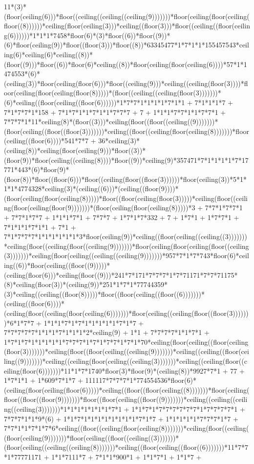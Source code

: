 11*(3)*(floor(ceiling(6)))*floor((ceiling((ceiling((ceiling(9)))))))*floor(ceiling(floor(ceiling(floor((8))))))*ceiling(floor(ceiling(3)))*ceiling((floor(3)))*floor((ceiling((floor(ceiling(6))))))*1*1*1*7458*floor(6)*(3)*floor((6))*floor((9))*(6)*floor(ceiling(9))*floor((floor(3)))*floor((8))*63345477*1*7*1*1*155457543*ceiling(6)*ceiling(6)*ceiling((8))*(floor((9)))*floor((6))*floor(6)*ceiling((8))*floor(ceiling(floor(ceiling(6))))*57*1*1474553*(6)*(ceiling(3))*floor(ceiling(floor(6)))*floor((ceiling(9)))*ceiling((ceiling(floor(3))))*floor(ceiling(floor(ceiling(floor(8)))))*(floor((ceiling((ceiling(floor(3)))))))*(6)*ceiling((floor(ceiling((floor(6))))))*1*7*7*1*1*1*1*7*1*1 + 7*1*1*1*7 + 7*1*7*7*1*158 + 7*1*7*1*1*7*1*1*7*7*7 + 7 + 1*1*1*7*7*1*1*7*7*1 + 7*7*7*1*11*ceiling(8)*(floor((3)))*ceiling(floor((floor((ceiling((9)))))))*(floor(ceiling((floor((floor(3)))))))*ceiling((floor((ceiling(floor(ceiling(8)))))))*floor(ceiling((floor(6))))*541*7*7 + 36*ceiling(3)*(ceiling(8))*ceiling(floor(ceiling(9)))*floor((3))*(floor(9))*floor(ceiling((ceiling(8))))*floor((9))*ceiling(9)*357471*7*1*1*1*1*7*17771*443*(6)*floor(9)*(floor(8))*floor((floor(6)))*floor((ceiling(floor((floor(3))))))*floor(ceiling(3))*5*1*1*1*4774328*ceiling(3)*(ceiling((6)))*(ceiling((floor(9))))*(floor(ceiling(floor(ceiling(8)))))*floor((floor(ceiling(floor(3)))))*ceiling(floor((ceiling(floor(ceiling(floor(9)))))))*(floor(ceiling(floor(ceiling(8)))))*3 + 7*7*1*7*7*1 + 7*7*1*7*7 + 1*1*1*7*1 + 7*7*7 + 1*7*1*7*332 + 7 + 1*7*1 + 1*7*7*1 + 7*1*1*1*7*1*1 + 7*1 + 7*1*7*7*7*1*1*1*1*1*1*3*floor(ceiling(9))*ceiling((floor(ceiling((ceiling((3)))))))*ceiling(floor((ceiling(floor((ceiling(9)))))))*floor(ceiling(floor(ceiling(floor((ceiling(3)))))))*ceiling(floor(ceiling((ceiling((ceiling(9)))))))*957*7*1*7*743*floor(6)*ceiling((6))*floor(ceiling((floor((9)))))*(ceiling(floor(6)))*ceiling(floor((9)))*241*7*171*7*7*7*1*7*71171*7*7*71175*(8)*ceiling(floor(3))*(ceiling(9))*251*1*7*1*77744359*(3)*ceiling((ceiling((floor(8)))))*floor((floor(ceiling((floor((6)))))))*(ceiling((floor(6))))*(ceiling(floor((ceiling(floor(ceiling(6)))))))*floor(ceiling((ceiling(floor((floor(3)))))))*6*1*7*7 + 1*1*1*7*1*7*1*1*1*1*1*7*1*7 + 7*7*7*7*7*1*1*1*7*1*1*1*2*ceiling(9) + 1*1 + 7*7*7*7*1*1*7*1 + 1*7*1*7*1*1*1*1*1*7*7*7*1*7*1*7*7*1*7*1*70*ceiling(floor(ceiling((floor(ceiling(floor(3)))))))*ceiling(floor((floor(ceiling((ceiling(9)))))))*ceiling((ceiling((floor(ceiling((9)))))))*ceiling((ceiling(floor(ceiling((ceiling(3)))))))*ceiling((ceiling(floor((ceiling(floor(6)))))))*11*1*7*1740*floor(3)*floor(9)*(ceiling(8))*9927*7*1 + 77 + 1*7*1*1 + 1*609*7*1*7 + 111117*7*7*7*1*774554536*floor(6)*(ceiling(floor(ceiling(floor(6)))))*ceiling((floor((floor(ceiling((8)))))))*floor(ceiling(floor((floor((floor(9)))))))*floor((floor(ceiling((floor((9)))))))*ceiling((ceiling((ceiling((ceiling(3)))))))*1*1*1*1*1*1*1*7*1 + 1*1*7*1*7*7*7*7*7*7*1*7*7*7*7*1 + 7*7*7*1*1*9*(6) + 1*1*7*1*1*1*1*1*1*1*1*7*1*7 + 1*1*1*1*1*7*7*7*1*7 + 7*7*1*1*7*1*7*6*ceiling((floor((ceiling(floor(ceiling(8)))))))*ceiling(floor((ceiling((floor(ceiling(9)))))))*floor(ceiling((floor((ceiling((3)))))))*(floor(ceiling((ceiling((ceiling(8)))))))*ceiling((floor(ceiling((floor((6)))))))*11*7*7*1*77771171 + 1*1*7111*7 + 7*1*1*900*1 + 1*1*7*1 + 1*1*7 + 